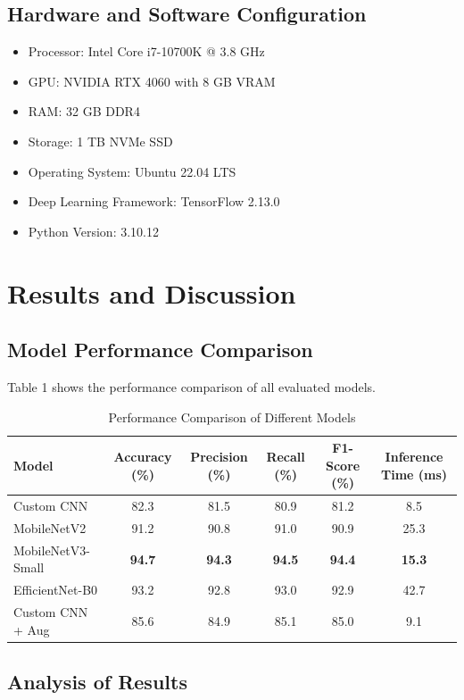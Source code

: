 \documentclass[conference]{IEEEtran}
\begin{document}
\subsection{Hardware and Software Configuration}
\begin{itemize}
\item Processor: Intel Core i7-10700K @ 3.8 GHz
\item GPU: NVIDIA RTX 4060 with 8 GB VRAM
\item RAM: 32 GB DDR4
\item Storage: 1 TB NVMe SSD
\item Operating System: Ubuntu 22.04 LTS
\item Deep Learning Framework: TensorFlow 2.13.0
\item Python Version: 3.10.12
\end{itemize}

\section{Results and Discussion}
\subsection{Model Performance Comparison}
Table 1 shows the performance comparison of all evaluated models.

\begin{table}[htbp]
\caption{Performance Comparison of Different Models}
\begin{center}
\begin{tabular}{lccccc}
\toprule
Model & Accuracy (\%) & Precision (\%) & Recall (\%) & F1-Score (\%) & Inference Time (ms) \\
\midrule
Custom CNN & 82.3 & 81.5 & 80.9 & 81.2 & 8.5 \\
MobileNetV2 & 91.2 & 90.8 & 91.0 & 90.9 & 25.3 \\
MobileNetV3-Small & \textbf{94.7} & \textbf{94.3} & \textbf{94.5} & \textbf{94.4} & \textbf{15.3} \\
EfficientNet-B0 & 93.2 & 92.8 & 93.0 & 92.9 & 42.7 \\
Custom CNN + Aug & 85.6 & 84.9 & 85.1 & 85.0 & 9.1 \\
\bottomrule
\end{tabular}
\end{center}
\end{table}

\subsection{Analysis of Results}
\end{document}
